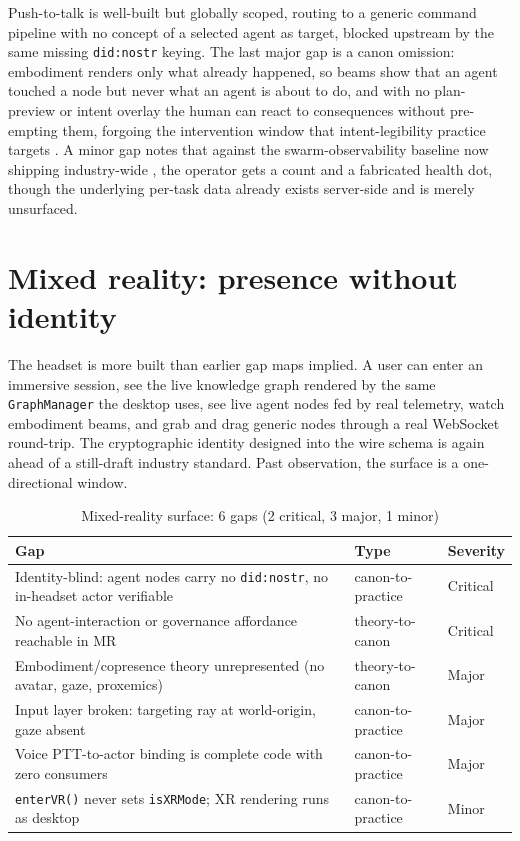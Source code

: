 Push-to-talk is well-built but globally scoped, routing to a generic command pipeline with no concept of a selected agent as target, blocked upstream by the same missing \texttt{did:nostr} keying. The last major gap is a canon omission: embodiment renders only what already happened, so beams show that an agent touched a node but never what an agent is about to do, and with no plan-preview or intent overlay the human can react to consequences without pre-empting them, forgoing the intervention window that intent-legibility practice targets \parencite{Nielsen2025Intent}. A minor gap notes that against the swarm-observability baseline now shipping industry-wide \parencite{AgentOps2024}, the operator gets a count and a fabricated health dot, though the underlying per-task data already exists server-side and is merely unsurfaced.

\section{Mixed reality: presence without identity}

The headset is more built than earlier gap maps implied. A user can enter an immersive session, see the live knowledge graph rendered by the same \texttt{GraphManager} the desktop uses, see live agent nodes fed by real telemetry, watch embodiment beams, and grab and drag generic nodes through a real WebSocket round-trip. The cryptographic identity designed into the wire schema is again ahead of a still-draft industry standard. Past observation, the surface is a one-directional window.

\begin{table}[h]
\centering
\caption{Mixed-reality surface: 6 gaps (2 critical, 3 major, 1 minor)}
\label{tab:gaps-mr}
\begin{tabularx}{\textwidth}{X L{3.2cm} L{1.6cm}}
\toprule
\textbf{Gap} & \textbf{Type} & \textbf{Severity} \\
\midrule
Identity-blind: agent nodes carry no \texttt{did:nostr}, no in-headset actor verifiable & canon-to-practice & Critical \\
\addlinespace
No agent-interaction or governance affordance reachable in MR & theory-to-canon & Critical \\
\addlinespace
Embodiment/copresence theory unrepresented (no avatar, gaze, proxemics) & theory-to-canon & Major \\
\addlinespace
Input layer broken: targeting ray at world-origin, gaze absent & canon-to-practice & Major \\
\addlinespace
Voice PTT-to-actor binding is complete code with zero consumers & canon-to-practice & Major \\
\addlinespace
\texttt{enterVR()} never sets \texttt{isXRMode}; XR rendering runs as desktop & canon-to-practice & Minor \\
\bottomrule
\end{tabularx}
\end{table}

